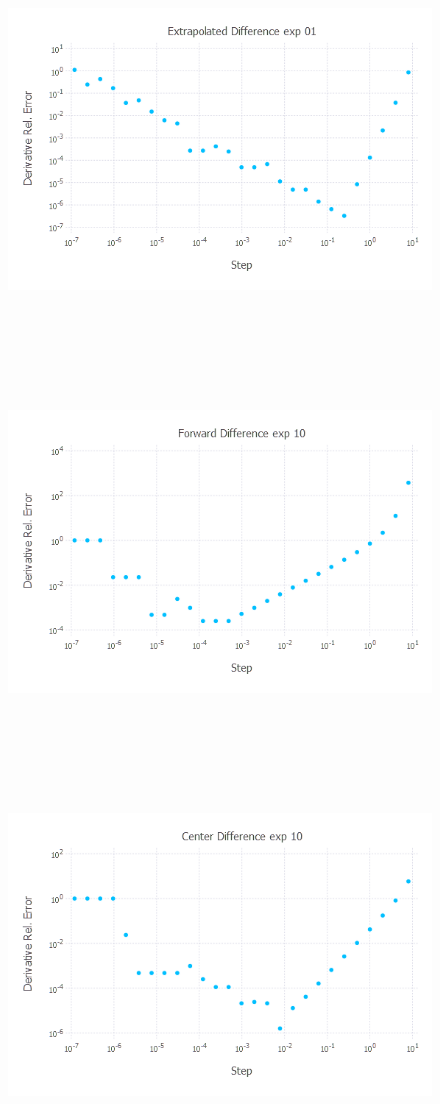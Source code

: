 \documentclass{article}
\begin{document}
\begin{figure}[H]
	\includegraphics[width=6in,height=4in]{"extrap exp 01"}
\end{figure}\begin{figure}[H]
	\includegraphics[width=6in,height=4in]{"forward exp 10"}
\end{figure}
\begin{figure}[H]
	\includegraphics[width=6in,height=4in]{"center exp 10"}
\end{figure}
\end{document}
